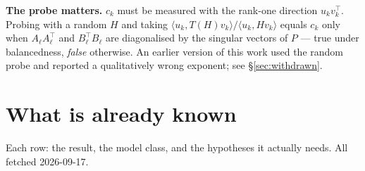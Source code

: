 \documentclass{article}
\newcommand{\NOTE}[1]{{\color{gray}\small #1}}
\theoremstyle{plain}\newtheorem{theorem}{Theorem}\newtheorem{lemma}[theorem]{Lemma}
\theoremstyle{definition}\newtheorem{definition}[theorem]{Definition}
\begin{document}
\NOTE{\textbf{The probe matters.} $c_k$ must be measured with the rank-one direction
$u_kv_k^\top$. Probing with a random $H$ and taking $\langle u_k,T(H)v_k\rangle/\langle
u_k,Hv_k\rangle$ equals $c_k$ only when $A_\ell A_\ell^\top$ and $B_\ell^\top B_\ell$ are
diagonalised by the singular vectors of $P$ --- true under balancedness, \emph{false} otherwise.
An earlier version of this work used the random probe and reported a qualitatively wrong
exponent; see \S\ref{sec:withdrawn}.}

\section{What is already known}\label{sec:sota}

\NOTE{Each row: the result, the model class, and the hypotheses it actually needs. All fetched
2026-09-17.}
\end{document}
